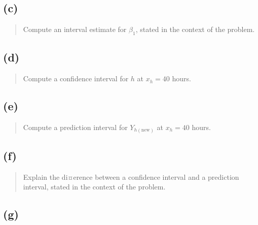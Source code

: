 \documentclass[
]{article}
\begin{document}
\vspace{50pt}

\hypertarget{c}{%
\subsection{(c)}\label{c}}

\begin{quote}
Compute an interval estimate for \(\beta_1\), stated in the context of
the problem.
\end{quote}

\vspace{50pt}

\hypertarget{d}{%
\subsection{(d)}\label{d}}

\begin{quote}
Compute a confidence interval for \(h\) at \(x_h = 40\) hours.
\end{quote}

\vspace{50pt}

\hypertarget{e}{%
\subsection{(e)}\label{e}}

\begin{quote}
Compute a prediction interval for \(Y_{h(\text{new})}\) at \(x_h = 40\)
hours.
\end{quote}

\vspace{50pt}

\hypertarget{f}{%
\subsection{(f)}\label{f}}

\begin{quote}
Explain the di¤erence between a confidence interval and a prediction
interval, stated in the context of the problem.
\end{quote}

\vspace{50pt}

\hypertarget{g}{%
\subsection{(g)}\label{g}}
\end{document}
